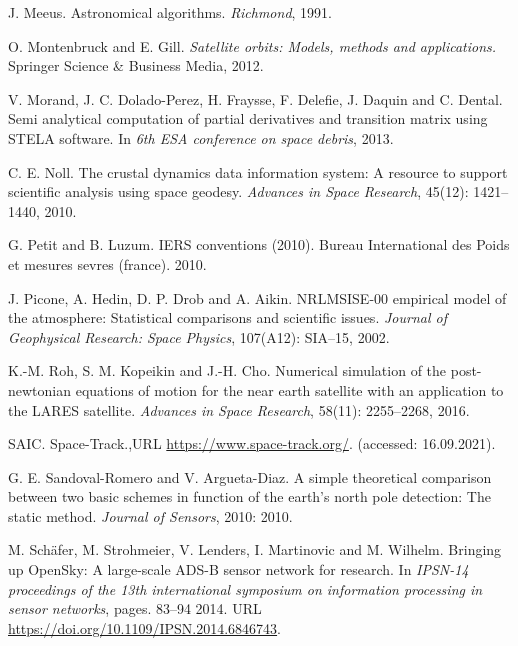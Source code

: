 \begin{CSLReferences}{1}{0}
\leavevmode{}%
J. Meeus. Astronomical algorithms. \emph{Richmond}, 1991.

\leavevmode{}%
O. Montenbruck and E. Gill. \emph{Satellite orbits: Models, methods and applications.} Springer Science \& Business Media, 2012.

\leavevmode{}%
V. Morand, J. C. Dolado-Perez, H. Fraysse, F. Delefie, J. Daquin and C. Dental. Semi analytical computation of partial derivatives and transition matrix using STELA software. In \emph{6th ESA conference on space debris}, 2013.

\leavevmode{}%
C. E. Noll. The crustal dynamics data information system: A resource to support scientific analysis using space geodesy. \emph{Advances in Space Research}, 45(12): 1421--1440, 2010.

\leavevmode{}%
G. Petit and B. Luzum. IERS conventions (2010). Bureau International des Poids et mesures sevres (france). 2010.

\leavevmode{}%
J. Picone, A. Hedin, D. P. Drob and A. Aikin. NRLMSISE-00 empirical model of the atmosphere: Statistical comparisons and scientific issues. \emph{Journal of Geophysical Research: Space Physics}, 107(A12): SIA--15, 2002.

\leavevmode{}%
K.-M. Roh, S. M. Kopeikin and J.-H. Cho. Numerical simulation of the post-newtonian equations of motion for the near earth satellite with an application to the LARES satellite. \emph{Advances in Space Research}, 58(11): 2255--2268, 2016.

\leavevmode{}%
SAIC. {Space-Track}.,URL \url{https://www.space-track.org/}. (accessed: 16.09.2021).

\leavevmode{}%
G. E. Sandoval-Romero and V. Argueta-Diaz. A simple theoretical comparison between two basic schemes in function of the earth's north pole detection: The static method. \emph{Journal of Sensors}, 2010: 2010.

\leavevmode{}%
M. Schäfer, M. Strohmeier, V. Lenders, I. Martinovic and M. Wilhelm. {Bringing up OpenSky: A large-scale ADS-B sensor network for research}. In \emph{IPSN-14 proceedings of the 13th international symposium on information processing in sensor networks}, pages. 83--94 2014. URL \url{https://doi.org/10.1109/IPSN.2014.6846743}.


\end{CSLReferences}
